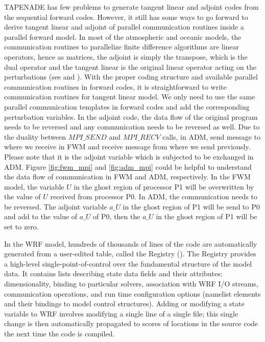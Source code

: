 \documentclass[12pt]{article}
\begin{document}
TAPENADE has few problems to generate tangent linear and adjoint codes from the sequential forward codes. However, it still has some ways to go forward to derive tangent linear and adjoint of parallel communication routines inside a parallel forward model. In most of the atmospheric and oceanic models, the communication routines to parallelize finite difference algorithms are linear operators, hence as matrices, the adjoint is simply the transpose, which is the dual operator and the tangent linear is the original linear operator acting on the perturbations (see \cite{Cheng2006ADb} and \cite{Utke2009TAM}). With the proper coding structure and available parallel communication routines in forward codes, it is straightforward to write communication routines for tangent linear model. We only need to use the same parallel communication templates in forward codes and add the corresponding perturbation variables. In the adjoint code, the data flow of the original program needs to be reversed and any communication needs to be reversed as well. Due to the duality between $MPI\_SEND$ and $MPI\_RECV$ calls, in ADM, send message to where we receive in FWM and receive message from where we send previously. Please note that it is the adjoint variable which is subjected to be exchanged in ADM. Figure \ref{fig:fwm_mpi} and \ref{fig:adm_mpi} could be helpful to understand the data flow of communication in FWM and ADM, respectively. In the FWM model, the variable $U$ in the ghost region of processor P1 will be overwritten by the value of $U$ received from processor P0. In ADM, the communication needs to be reversed. The adjoint variable $a\_U$ in the ghost region of P1 will be send to P0 and add to the value of $a\_U$ of P0, then the $a\_U$ in the ghost region of P1 will be set to zero. 

In the WRF model, hundreds of thousands of lines of the code are automatically generated from a user-edited table, called the Registry (\cite{John2004}).  The Registry provides a high-level single-point-of-control over the fundamental structure of the model data.  It contains lists describing state data fields and their attributes:  dimensionality, binding to particular solvers, association with WRF I/O streams, communication operations, and run time configuration options (namelist elements and their bindings to model control structures).  Adding or modifying a state variable to WRF involves modifying a single line of a single file; this single change is then automatically propagated to scores of locations in the source code the next time the code is compiled.
\end{document}
